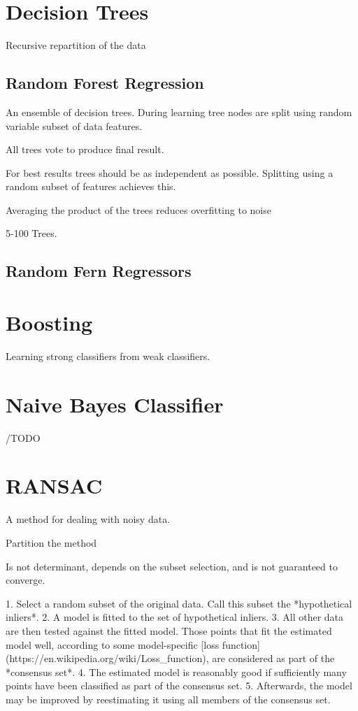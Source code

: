 {{\section{Decision Trees}
Recursive repartition of the data

\subsection{Random Forest Regression}

An ensemble of decision trees. During learning tree nodes are split using random variable subset of data features.

All trees vote to produce final result.

For best results trees should be as independent as possible. Splitting using a random subset of features achieves this.

Averaging the product of the trees reduces overfitting to noise

5-100 Trees.

\subsection{Random Fern Regressors}



\section{Boosting}
Learning strong classifiers from weak classifiers.





\section{Naive Bayes Classifier}

/TODO

\section{RANSAC}

A method for dealing with noisy data. 

Partition the method 

Is not determinant, depends on the subset selection, and is not guaranteed to converge.

1. Select a random subset of the original data. Call this subset the *hypothetical inliers*.
2. A model is fitted to the set of hypothetical inliers.
3. All other data are then tested against the fitted model. Those points that fit the estimated model well, according to some model-specific [loss function](https://en.wikipedia.org/wiki/Loss_function), are considered as part of the *consensus set*.
4. The estimated model is reasonably good if sufficiently many points have been classified as part of the consensus set.
5. Afterwards, the model may be improved by reestimating it using all members of the consensus set.

}}
